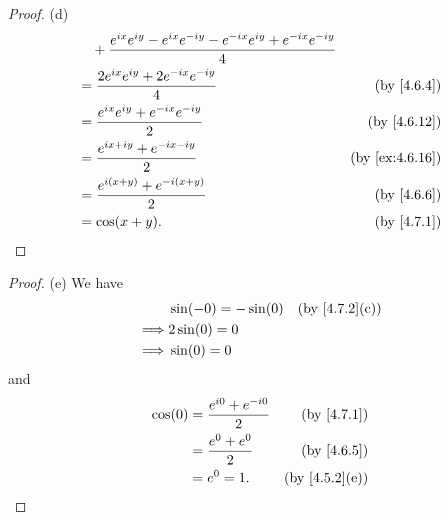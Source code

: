 \begin{proof}{(d)}
\begin{align*}
     & \quad + \frac{e^{i x} e^{i y} - e^{i x} e^{- i y} - e^{- i x} e^{i y} + e^{- i x} e^{- i y}}{4}                                                              \\
     & = \frac{2 e^{i x} e^{i y} + 2 e^{- i x} e^{- i y}}{4}                                                                         & \text{(by \cref{4.6.4})}     \\
     & = \frac{e^{i x} e^{i y} + e^{- i x} e^{- i y}}{2}                                                                             & \text{(by \cref{4.6.12})}    \\
     & = \frac{e^{i x + i y} + e^{- i x - i y}}{2}                                                                                   & \text{(by \cref{ex:4.6.16})} \\
     & = \frac{e^{i (x + y)} + e^{- i (x + y)}}{2}                                                                                   & \text{(by \cref{4.6.6})}     \\
     & = \cos(x + y).                                                                                                                & \text{(by \cref{4.7.1})}
  \end{align*}
\end{proof}

\begin{proof}{(e)}
  We have
  \begin{align*}
             & \sin(-0) = -\sin(0) & \text{(by \cref{4.7.2}(c))} \\
    \implies & 2 \sin(0) = 0                                     \\
    \implies & \sin(0) = 0
  \end{align*}
  and
  \begin{align*}
    \cos(0) & = \frac{e^{i 0} + e^{- i 0}}{2} & \text{(by \cref{4.7.1})}    \\
            & = \frac{e^{0} + e^{0}}{2}       & \text{(by \cref{4.6.5})}    \\
            & = e^0 = 1.                      & \text{(by \cref{4.5.2}(e))}
  \end{align*}
\end{proof}

